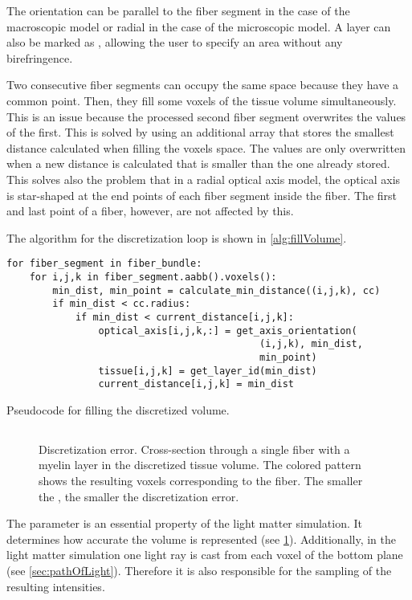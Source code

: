 The orientation can be parallel to the fiber segment in the case of the macroscopic model or radial in the case of the microscopic model.
A layer can also be marked as , allowing the user to specify an area without any birefringence.
\par
%
Two consecutive fiber segments can occupy the same space because they have a common point.
Then, they fill some voxels of the tissue volume simultaneously.
This is an issue because the processed second fiber segment overwrites the values of the first.
This is solved by using an additional array that stores the smallest distance calculated when filling the voxels space.
The values are only overwritten when a new distance is calculated that is smaller than the one already stored.
This solves also the problem that in a radial optical axis model, the optical axis is star-shaped at the end points of each fiber segment inside the fiber.
The first and last point of a fiber, however, are not affected by this.
\par
%
The algorithm for the discretization loop is shown in \cref{alg:fillVolume}.
%
\begin{lstfloat}[!tb]
\lstset{style=python}
\begin{lstlisting}[]
for fiber_segment in fiber_bundle:
    for i,j,k in fiber_segment.aabb().voxels():
        min_dist, min_point = calculate_min_distance((i,j,k), cc)
        if min_dist < cc.radius:
            if min_dist < current_distance[i,j,k]:
                optical_axis[i,j,k,:] = get_axis_orientation(
                                            (i,j,k), min_dist,
                                            min_point)
                tissue[i,j,k] = get_layer_id(min_dist)
                current_distance[i,j,k] = min_dist
\end{lstlisting}
\caption{Pseudocode for filling the discretized volume.}
\label{alg:fillVolume}
\end{lstfloat}
%
%
%
\subsection{\Voxelsize}
%
\begin{figure}[!t]
\centering
\setlength{\tikzwidth}{.24\textwidth}

\caption{Discretization error. Cross-section through a single fiber with a myelin layer in the discretized tissue volume. The colored pattern shows the resulting voxels corresponding to the fiber. The smaller the \Voxelsize, the smaller the discretization error.}
\label{fig:vectorfield_disc_error}
\end{figure}
%
The parameter \Voxelsize{} is an essential property of the light matter simulation.
It determines how accurate the volume is represented (see \cref{fig:vectorfield_disc_error}).
Additionally, in the light matter simulation one light ray is cast from each voxel of the bottom plane (see \cref{sec:pathOfLight}). 
Therefore it is also responsible for the sampling of the resulting intensities.
%
%
% 
